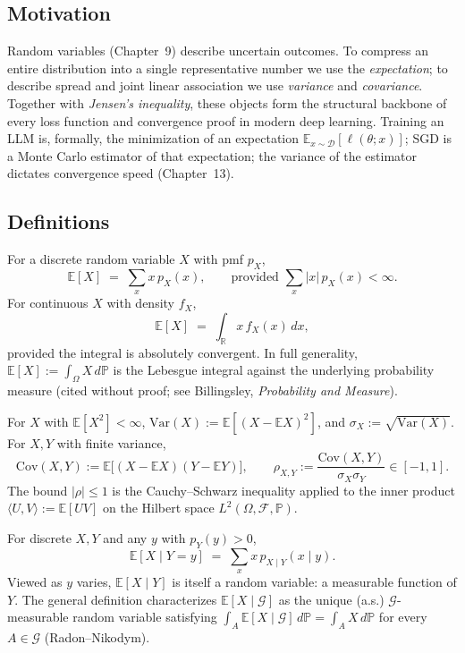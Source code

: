 \subsection*{Motivation}

Random variables (Chapter~9) describe uncertain outcomes. To compress an entire distribution into a single representative number we use the \emph{expectation}; to describe spread and joint linear association we use \emph{variance} and \emph{covariance}. Together with \emph{Jensen's inequality}, these objects form the structural backbone of every loss function and convergence proof in modern deep learning. Training an LLM is, formally, the minimization of an expectation $\mathbb{E}_{x\sim\mathcal{D}}[\ell(\theta;x)]$; SGD is a Monte Carlo estimator of that expectation; the variance of the estimator dictates convergence speed (Chapter~13).

\subsection*{Definitions}

\begin{definition}[Expectation]
For a discrete random variable $X$ with pmf $p_X$,
\[
\mathbb{E}[X] \;=\; \sum_x x\,p_X(x), \qquad \text{provided } \sum_x |x|\,p_X(x) < \infty.
\]
For continuous $X$ with density $f_X$,
\[
\mathbb{E}[X] \;=\; \int_{\mathbb{R}} x\,f_X(x)\,dx,
\]
provided the integral is absolutely convergent. In full generality, $\mathbb{E}[X] := \int_\Omega X\,d\mathbb{P}$ is the Lebesgue integral against the underlying probability measure (cited without proof; see Billingsley, \emph{Probability and Measure}).
\end{definition}

\begin{definition}
For $X$ with $\mathbb{E}[X^2] < \infty$, $\mathrm{Var}(X) := \mathbb{E}[(X - \mathbb{E}X)^2]$, and $\sigma_X := \sqrt{\mathrm{Var}(X)}$. For $X,Y$ with finite variance,
\[
\mathrm{Cov}(X,Y) := \mathbb{E}\big[(X-\mathbb{E}X)(Y-\mathbb{E}Y)\big], \qquad
\rho_{X,Y} := \frac{\mathrm{Cov}(X,Y)}{\sigma_X\sigma_Y} \in [-1,1].
\]
The bound $|\rho|\le 1$ is the Cauchy--Schwarz inequality applied to the inner product $\langle U,V\rangle := \mathbb{E}[UV]$ on the Hilbert space $L^2(\Omega,\mathcal{F},\mathbb{P})$.
\end{definition}

\begin{definition}
For discrete $X,Y$ and any $y$ with $p_Y(y) > 0$,
\[
\mathbb{E}[X\mid Y = y] \;=\; \sum_x x\,p_{X\mid Y}(x\mid y).
\]
Viewed as $y$ varies, $\mathbb{E}[X\mid Y]$ is itself a random variable: a measurable function of $Y$. The general definition characterizes $\mathbb{E}[X\mid \mathcal{G}]$ as the unique (a.s.) $\mathcal{G}$-measurable random variable satisfying $\int_A \mathbb{E}[X\mid\mathcal{G}]\,d\mathbb{P} = \int_A X\,d\mathbb{P}$ for every $A\in\mathcal{G}$ (Radon--Nikodym).
\end{definition}


